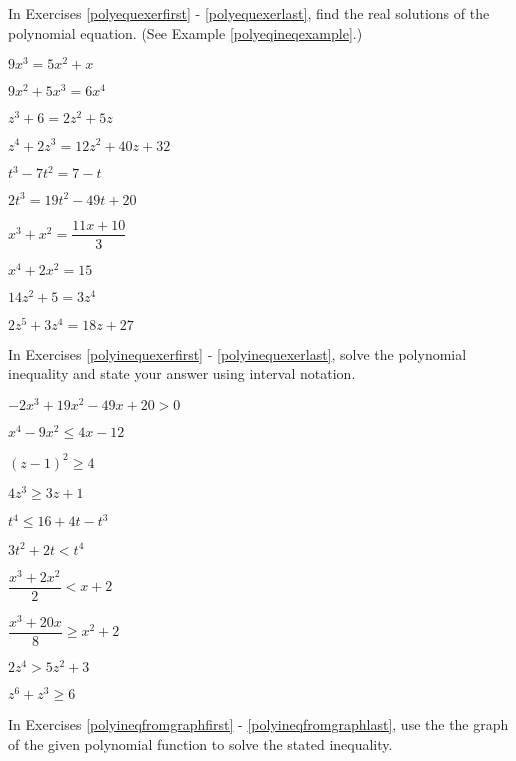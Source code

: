 In Exercises \ref{polyequexerfirst} - \ref{polyequexerlast}, find the real solutions of the polynomial equation.  (See Example \ref{polyeqineqexample}.)

\begin{shortexenum}[$z^{4} + 2z^{3} = 12z^{2} + 40z + 32$ ]
\item  $9x^{3} = 5x^{2} + x$  \label{polyequexerfirst} 
\item $9x^{2}+5x^{3}= 6x^{4}$  
\item $z^{3} + 6 = 2z^{2} + 5z$ 
\item $z^{4} + 2z^{3} = 12z^{2} + 40z + 32$ 
\item $t^{3} - 7t^{2} = 7-t$ 
\item $2t^{3} = 19t^{2} - 49t + 20$ 
\item $x^{3} + x^{2} = \dfrac{11x + 10}{3}$ 
\item $x^4+2x^2 = 15$ 
\item $14z^{2}+5=3z^{4}$  
\item $2z^5+3z^4 = 18z + 27$ \label{polyequexerlast}  
\end{shortexenum}

In Exercises \ref{polyinequexerfirst} - \ref{polyinequexerlast}, solve the polynomial inequality and state your answer using interval notation.

\begin{shortexenum}[$-2x^{3} + 19x^{2} - 49x + 20 > 0$]
\item $-2x^{3} + 19x^{2} - 49x + 20 > 0$ \label{polyinequexerfirst}
\item $x^{4} - 9x^{2} \leq 4x - 12$
\item $(z - 1)^{2} \geq 4$
\item $4z^3 \geq 3z+1$
\item $t^4 \leq 16+4t-t^3$
\item $3t^2 + 2t < t^4$
\item $\dfrac{x^3+2 x^2}{2} < x+2$
\item $\dfrac{x^3+20x}{8} \geq x^2 + 2$
\item $2z^4>5z^2+3$
\item $z^6 + z^3 \geq 6$ \label{polyinequexerlast}
\end{shortexenum}

In Exercises \ref{polyineqfromgraphfirst} - \ref{polyineqfromgraphlast}, use the the graph of the given polynomial function to  solve the stated inequality.

